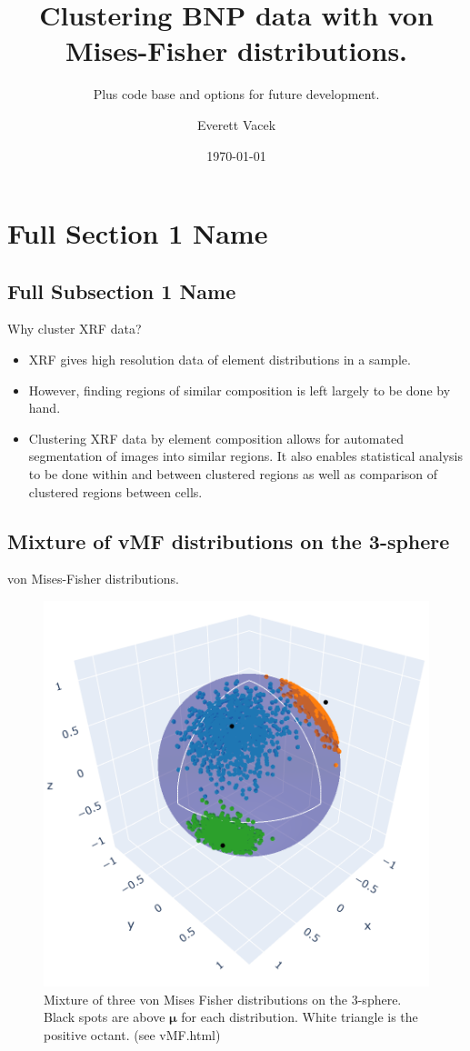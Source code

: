 \documentclass[
]{beamer}
\title[Short Presentation Title]{Clustering BNP data with von Mises-Fisher distributions.}
\subtitle[Short Presentation Subtitle]{Plus code base and options for future development.}
\author[E. Vacek]{Everett Vacek}
\date{\today}
\begin{document}
\begin{frame}[plain]
\maketitle
\end{frame}

\section[Short Section 1 Name]{Full Section 1 Name}
\subsection[Short Subsection 1 Name]{Full Subsection 1 Name}

\begin{frame}{Why cluster XRF data?}
    \begin{itemize}
        \item XRF gives high resolution data of element distributions in a sample.
        \item However, finding regions of similar composition is left largely to be done by hand.
        \item Clustering XRF data by element composition allows for automated segmentation of  images into similar regions. It also enables statistical analysis to be done within and between clustered regions as well as comparison of clustered regions between cells.
    \end{itemize}
\end{frame}

\subsection[movMF image]{Mixture of vMF distributions on the 3-sphere}
\begin{frame}{von Mises-Fisher distributions.}
\begin{figure}[h]
  \includegraphics[width=.5\textwidth,height=.5\textheight,keepaspectratio]{vMF.png}
  \caption{Mixture of three von Mises Fisher distributions on the 3-sphere. Black spots are above $\boldsymbol{\mu}$ for each distribution. White triangle is the positive octant. (see vMF.html)
  }
\end{figure}
\end{frame}
\end{document}

